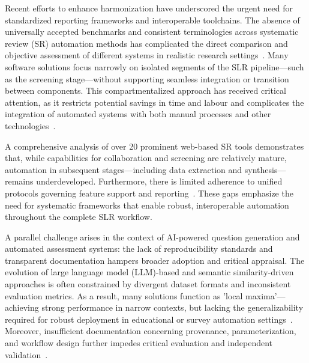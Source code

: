 \documentclass[sigconf]{acmart}
\begin{document}
Recent efforts to enhance harmonization have underscored the urgent need for standardized reporting frameworks and interoperable toolchains. The absence of universally accepted benchmarks and consistent terminologies across systematic review (SR) automation methods has complicated the direct comparison and objective assessment of different systems in realistic research settings~\cite{ref37,ref63,ref86,ref106}. Many software solutions focus narrowly on isolated segments of the SLR pipeline—such as the screening stage—without supporting seamless integration or transition between components. This compartmentalized approach has received critical attention, as it restricts potential savings in time and labour and complicates the integration of automated systems with both manual processes and other technologies~\cite{ref29,ref37,ref38,ref80}.

A comprehensive analysis of over 20 prominent web-based SR tools demonstrates that, while capabilities for collaboration and screening are relatively mature, automation in subsequent stages—including data extraction and synthesis—remains underdeveloped. Furthermore, there is limited adherence to unified protocols governing feature support and reporting~\cite{ref29,ref62,ref63,ref68,ref78}. These gaps emphasize the need for systematic frameworks that enable robust, interoperable automation throughout the complete SLR workflow.

A parallel challenge arises in the context of AI-powered question generation and automated assessment systems: the lack of reproducibility standards and transparent documentation hampers broader adoption and critical appraisal. The evolution of large language model (LLM)-based and semantic similarity-driven approaches is often constrained by divergent dataset formats and inconsistent evaluation metrics. As a result, many solutions function as 'local maxima'—achieving strong performance in narrow contexts, but lacking the generalizability required for robust deployment in educational or survey automation settings~\cite{ref1,ref2,ref5,ref9,ref10}. Moreover, insufficient documentation concerning provenance, parameterization, and workflow design further impedes critical evaluation and independent validation~\cite{ref9,ref30,ref43,ref61,ref96,ref98}.
\end{document}
